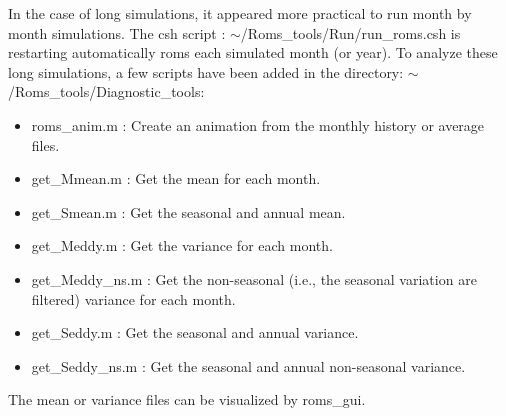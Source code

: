 %
%
In the case of long simulations, it appeared more practical
to run month by month simulations. The csh script :
$\sim$/Roms\_tools/Run/run\_roms.csh is restarting automatically
roms each simulated month (or year). To analyze these long simulations,
a few scripts have been added in the directory: 
$\sim$/Roms\_tools/Diagnostic\_tools:
\begin{itemize}
\item roms\_anim.m  : Create an animation from the monthly  history or average files.
\item get\_Mmean.m  : Get the mean for each month.
\item get\_Smean.m  : Get the seasonal and annual mean.
\item get\_Meddy.m  : Get the variance for each month.
\item get\_Meddy\_ns.m  : Get the non-seasonal (i.e., the seasonal variation are 
filtered) variance for each month.
\item get\_Seddy.m  : Get the seasonal and annual variance.
\item get\_Seddy\_ns.m  : Get the seasonal and annual non-seasonal variance.
\end{itemize}
The mean or variance files can be visualized by roms\_gui.
